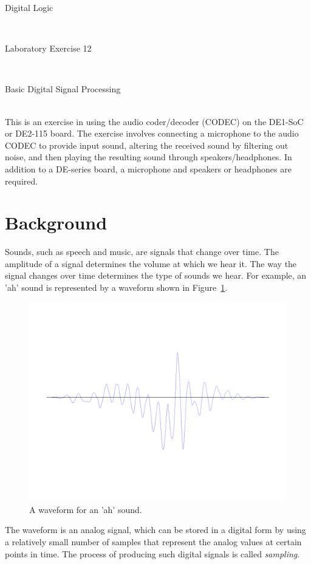 \documentclass[epsfig,10pt,fullpage]{article}
\newcommand{\LabNum}{12}
\begin{document}
\centerline{\huge Digital Logic}
~\\
\centerline{\huge Laboratory Exercise \LabNum}
~\\
\centerline{\large Basic Digital Signal Processing}
~\\

This is an exercise in using the audio coder/decoder (CODEC) on the  DE1-SoC or DE2-115 board.  
The exercise involves connecting a microphone to the audio CODEC to provide input sound, 
altering the received sound by filtering out noise, and then playing the resulting 
sound through speakers/headphones. In addition to a DE-series board, a microphone and
speakers or headphones are required.


\section*{Background}
Sounds, such as speech and music, are signals that change over time. The amplitude of a 
signal determines the volume at which we hear it. The way the signal changes over time 
determines the type of sounds we hear. For example, an 'ah' sound is represented by a waveform 
shown in Figure~\ref{fig:original_waveform}.

\begin{figure}[H]
\centering
\includegraphics[width=4.5in]{figures/sound_wave_ah.pdf}
\caption{A waveform for an 'ah' sound.}
\label{fig:original_waveform}
\end{figure}

The waveform is an analog signal, which can be stored in a digital form by using a relatively 
small number of samples that represent the analog values at certain points in time. The process 
of producing such digital signals is called {\it sampling}.
\end{document}
